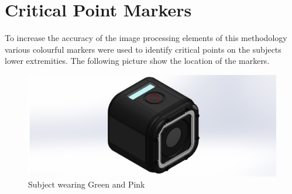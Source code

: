 \section{Critical Point Markers}
To increase the accuracy of the image processing elements of this methodology various colourful markers were used to identify critical points on the subjects lower extremities. The following picture show the location of the markers.

\begin{figure}[!ht] 
\captionsetup{width=\linewidth, font=small}  
\includegraphics[width=\linewidth]{figures/GoProHero4Session.JPG}
\caption{Subject wearing Green and Pink }
\label{fig:GoProHero4Session}
\end{figure}




